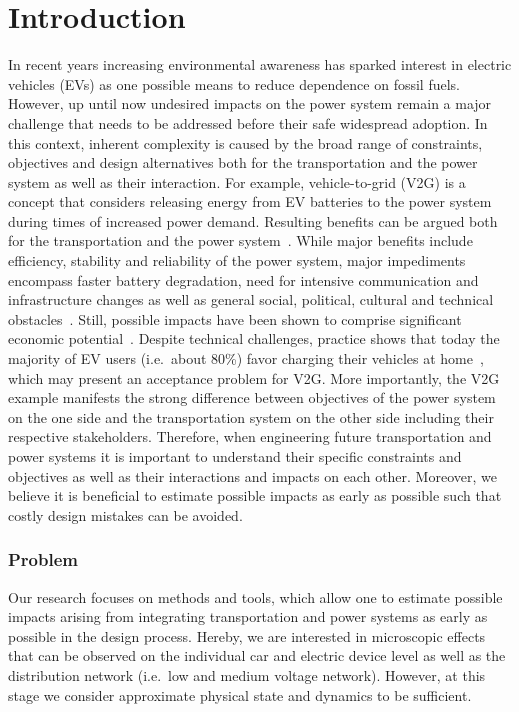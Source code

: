 \section{Introduction}

In recent years increasing environmental awareness has sparked interest in electric vehicles (EVs) as one possible means to reduce dependence on fossil fuels. However, up until now undesired impacts on the power system remain a major challenge that needs to be addressed before their safe widespread adoption. In this context, inherent complexity is caused by the broad range of constraints, objectives and design alternatives both for the transportation and the power system as well as their interaction. For example, vehicle-to-grid (V2G) is a concept that considers releasing energy from EV batteries to the power system during times of increased power demand. Resulting benefits can be argued both for the transportation and the power system~\cite{tomic2007using}. While major benefits include efficiency, stability and reliability of the power system, major impediments encompass faster battery degradation, need for intensive communication and infrastructure changes as well as general social, political, cultural and technical obstacles~\cite{yilmaz2013review}. Still, possible impacts have been shown to comprise significant economic potential~\cite{peterson2010economics,erdinc2014economic}. Despite technical challenges, practice shows that today the majority of EV users (i.e.\ about 80\%) favor charging their vehicles at home~\cite{haines2009simulation}, which may present an acceptance problem for V2G. More importantly, the V2G example manifests the strong difference between objectives of the power system on the one side and the transportation system on the other side including their respective stakeholders. Therefore, when engineering future transportation and power systems it is important to understand their specific constraints and objectives as well as their interactions and impacts on each other. Moreover, we believe it is beneficial to estimate possible impacts as early as possible such that costly design mistakes can be avoided.

\subsubsection*{Problem}

Our research focuses on methods and tools, which allow one to estimate possible impacts arising from integrating  transportation and power systems as early as possible in the design process. Hereby, we are interested in microscopic effects that can be observed on the individual car and electric device level as well as the distribution network (i.e.\ low and medium voltage network). However, at this stage we consider approximate physical state and dynamics to be sufficient.


